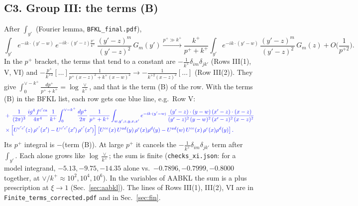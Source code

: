 \documentclass[9pt]{article}
\newcommand{\nc}{\color{blue}}
\numberwithin{equation}{section}
\begin{document}
\subsection*{C3. Group III: the terms (B)}
After $\int_{y'}$ (Fourier lemma, \texttt{BFKL\_final.pdf}),
\begin{equation*}
\int_{y'}e^{-ik\cdot(y'-w)}\,e^{-ik\cdot(y'-z)\frac{p^+}{k^+}}\,\frac{(y'-z)^m}{(y'-z)^2}\,G_m(y')\xrightarrow{p^+\gg k^+}\frac{k^+}{p^++k^+}\int_{y'}e^{-ik\cdot(y'-w)}\,\frac{(y'-z)^m}{(y'-z)^2}\,G_m(z)+O\Big(\frac{1}{p^{+2}}\Big).
\end{equation*}
In the $p^+$ bracket, the terms that tend to a constant are $-\frac{1}{k^+}\delta_{im}\delta_{jk'}$ (Rows III(1), V, VI) and $-\frac{p^+}{k^{+2}}[\dots]\frac{1}{p^+(x-z)^2+k^+(x-w)^2}\to-\frac{1}{k^{+2}(x-z)^2}[\dots]$ (Row III(2)). They give $\int^{\vee-k^+}_0\frac{dp^+}{p^++k^+}=\log\frac{\vee}{k^+}$, and that is the term (B) of the row. With the terms (B) in the BFKL list, each row gets one blue line, e.g.\ Row V:
\begin{align}
&\nc +\,\frac{1}{(2\pi)^{3}}\, \frac{ig^{4}\,f^{c'ca}}{4\pi^{4}}\, \frac{1}{k^{+}}\int_{0}^{\vee-k^{+}} \frac{dp^{+}}{2\pi}\,\frac{1}{p^{+}+k^{+}} \int_{w,y',z,y,x,x'} e^{-ik\cdot (y'-w)}\,\frac{(y'-z)\cdot (y-w)\,(x'-z)\cdot (x-z)}{(y'-z)^{2}\,(y-w)^{2}\,(x'-z)^{2}\,(x-z)^{2}}\notag \\ &\nc \times\left[U^{e'c'}(z)\,\rho^{e'}(x')-U^{c'e'}(x')\,\rho^{e'}(x')\right]\left[U^{ce}(x)\,U^{ad}(y)\,\rho^{e}(x)\rho^{d}(y)-U^{ad}(w)\,U^{ce}(x)\,\rho^{e}(x)\rho^{d}(y)\right].
\end{align}
Its $p^+$ integral is $-$(term (B)). At large $p^+$ it cancels the $-\frac{1}{k^+}\delta_{im}\delta_{jk'}$ term after $\int_{y'}$. Each alone grows like $\log\frac{\vee}{k^+}$; the sum is finite (\texttt{checks\_xi.json}: for a model integrand, $-5.13, -9.75, -14.35$ alone vs.\ $-0.7896, -0.7999, -0.8000$ together, at $\vee/k^+\approx10^2,10^4,10^6$). In the variables of AABKL the sum is a plus prescription at $\xi\to1$ (Sec.~\ref{sec:aabkl}). The lines of Rows III(1), III(2), VI are in \texttt{Finite\_terms\_corrected.pdf} and in Sec.~\ref{sec:fin}.
\end{document}
